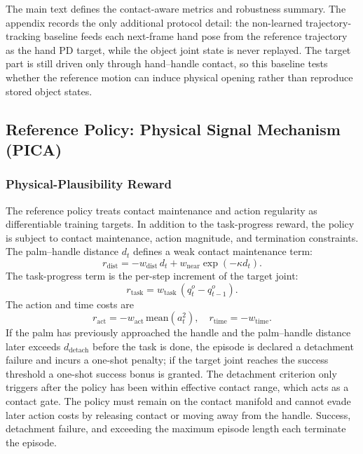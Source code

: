 \documentclass{llmxive}
\begin{document}
The main text defines the contact-aware metrics and robustness
summary. The appendix records the only additional protocol detail:
the non-learned trajectory-tracking baseline feeds each next-frame
hand pose from the reference trajectory as the hand PD target, while
the object joint state is never replayed. The target part is still
driven only through hand--handle contact, so this baseline tests
whether the reference motion can induce physical opening rather than
reproduce stored object states.

\subsection{Reference Policy: Physical Signal Mechanism (PICA)}
\label{sec:pica_app}

\subsubsection{Physical-Plausibility Reward}
\label{sec:reward}

The reference policy treats contact maintenance and action regularity
as differentiable training targets. In addition to the task-progress
reward, the policy is subject to contact maintenance, action
magnitude, and termination constraints. The palm--handle distance
$d_t$ defines a weak contact
maintenance term:
\begin{equation}
r_{\mathrm{dist}} = -w_{\mathrm{dist}}\,d_t
+ w_{\mathrm{near}}\exp(-\kappa d_t).
\end{equation}
The task-progress term is the per-step increment of the target joint:
\begin{equation}
r_{\mathrm{task}} = w_{\mathrm{task}}\,(q_t^o - q_{t-1}^o).
\end{equation}
The action and time costs are
\begin{equation}
r_{\mathrm{act}} = -w_{\mathrm{act}}\,
\mathrm{mean}(a_t^2),\quad
r_{\mathrm{time}} = -w_{\mathrm{time}}.
\end{equation}
If the palm has previously approached the handle and the palm--handle
distance later exceeds $d_{\mathrm{detach}}$ before the task is
done, the episode is declared a detachment failure and incurs a
one-shot penalty; if the target joint reaches the success threshold
a one-shot success bonus is granted. The detachment criterion only
triggers after the policy has been within effective contact range,
which acts as a contact gate. The policy must remain on the contact
manifold and cannot evade later action costs by releasing contact or
moving away from the handle. Success, detachment failure, and
exceeding the maximum episode length each terminate the episode.
\end{document}
